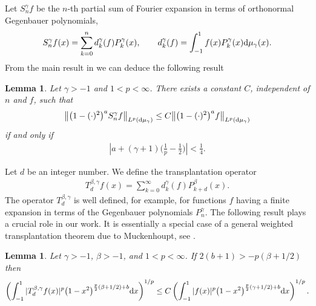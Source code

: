 \documentclass[11pt]{article}
\newtheorem{lem}[thm]{Lemma}
\numberwithin{equation}{section}
\begin{document}
Let $S_n^{\gamma}f$ be the $n$-th partial sum of Fourier expansion in terms of orthonormal Gegenbauer polynomials,
\begin{gather*}
S_n^{\gamma}f(x)=\sum_{k=0}^n d_k^{\gamma}(f)P_k^{\gamma}(x),\qquad d_k^{\gamma}(f)=\int_{-1}^1 f(x)P_k^{\gamma}(x) {\rm d}\mu_{\gamma}(x).
\end{gather*}
From the main result in \cite{muckenhoupt1} we can deduce the following result
\begin{lem}\label{acotacion}
	Let $\gamma>-1$ and $1<p<\infty$. There exists a constant $C$, independent of $n$ and $f$, such that
	\begin{gather*}
	\big\|\big(1-(\cdot)^2\big)^a S^{\gamma}_nf\big\|_{L^p({\rm d}\mu_{\gamma})}\le C\big\|\big(1-(\cdot)^2\big)^a f\big\|_{L^p ({\rm d}\mu_{\gamma})}
	\end{gather*}
	if and only if
	\begin{gather*}%
	\left|a+(\gamma+1)\bigg(\frac{1}{p}-\frac{1}{2}\bigg)\right|<\frac{1}{4}.
	\end{gather*}
\end{lem}

Let $d$ be an integer number. We define the transplantation operator
\begin{gather*}
T_{d}^{\beta,\gamma}f(x)=\sum_{k=0}^{\infty}d_k^{\gamma}(f)P_{k+d}^{\beta}(x).
\end{gather*}
The operator $T_{d}^{\beta,\gamma}$ is well defined, for example, for functions $f$ having a finite expansion in terms of the Gegenbauer polynomials $P_n^\gamma$. The following result plays a crucial role in our work. It is essentially a special case of a general weighted transplantation theorem due to Muckenhoupt, see \cite[Theorem 1.6]{muckenhoupt}.

\begin{lem}\label{mukchenhoupt}
	Let $\gamma>-1$, $\beta>-1$, and $1<p<\infty$. If $2(b+1)>-p(\beta+1/2)$ then	
	\begin{gather*}%
	\left(\int_{-1}^{1}|T_{d}^{\beta,\gamma}f(x)|^p\big(1-x^2\big)^{\frac{p}{2}(\beta+1/2)+b} {\rm d}x\right)^{1/p} \le C\left(\int_{-1}^{1}|f(x)|^p\big(1-x^2\big)^{\frac{p}{2}(\gamma+1/2)+b} {\rm d}x\right)^{1/p}.
	\end{gather*}
\end{lem}
\end{document}
